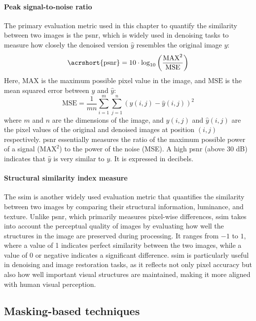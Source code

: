 \paragraph{Peak signal-to-noise ratio}
The primary evaluation metric used in this chapter to quantify the similarity between two images is the \acrfull{psnr}, which is widely used in denoising tasks to measure how closely the denoised version $\hat{y}$ resembles the original image $y$:
\begin{equation}\label{eq:psnr}
    \text{\acrshort{psnr}} = 10 \cdot \log_{10} \left( \frac{\text{MAX}^2}{\text{MSE}} \right) 
\end{equation}
Here, $\text{MAX}$ is the maximum possible pixel value in the image, and $\text{MSE}$ is the mean squared error between $y$ and $\hat{y}$:
\begin{equation}
    \text{MSE} = \frac{1}{mn}\sum_{i=1}^m \sum_{j=1}^n \left( y(i, j) - \hat{y}(i, j) \right)^2
\end{equation}
where $m$ and $n$ are the dimensions of the image, and $y(i, j)$ and $\hat{y}(i, j)$ are the pixel values of the original and denoised images at position $(i, j)$ respectively. \acrshort{psnr} essentially measures the ratio of the maximum possible power of a signal ($\text{MAX}^2$) to the power of the noise (MSE). A high \acrshort{psnr} (above 30 dB) indicates that $\hat{y}$ is very similar to $y$. It is expressed in decibels.

\paragraph{Structural similarity index measure}

The \acrfull{ssim} is another widely used evaluation metric that quantifies the similarity between two images by comparing their structural information, luminance, and texture. Unlike \acrshort{psnr}, which primarily measures pixel-wise differences, \acrshort{ssim} takes into account the perceptual quality of images by evaluating how well the structures in the image are preserved during processing. It ranges from $-1$ to $1$, where a value of 1 indicates perfect similarity between the two images, while a value of 0 or negative indicates a significant difference. \acrshort{ssim} is particularly useful in denoising and image restoration tasks, as it reflects not only pixel accuracy but also how well important visual structures are maintained, making it more aligned with human visual perception.

\subsection{Masking-based techniques}

